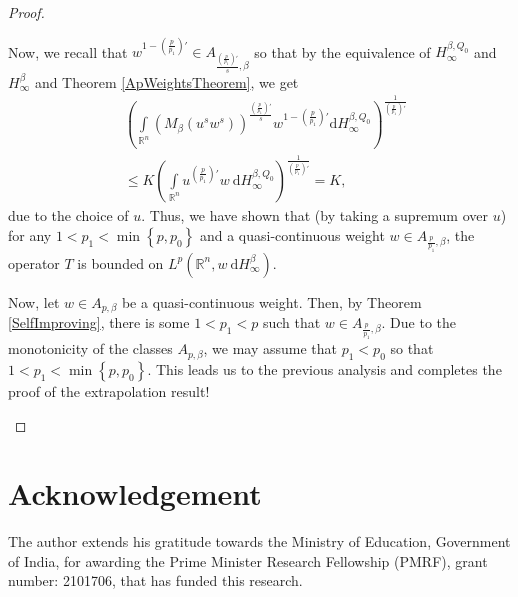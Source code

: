 \documentclass{amsart}
\numberwithin{theorem}{section}
\numberwithin{equation}{section}
\begin{document}
\begin{proof}
\begin{enumerate}
				Now, we recall that $w^{1 - \left( \frac{p}{p_1} \right)'} \in A_{\frac{\left( \frac{p}{p_1} \right)'}{s}, \beta}$ so that by the equivalence of $H^{\beta, Q_0}_{\infty}$ and $H^{\beta}_{\infty}$ and Theorem \ref{ApWeightsTheorem}, we get
				\begin{align*}
					&\left( \int\limits_{\mathbb{R}^n} \left( M_{\beta} \left( u^sw^s \right) \right)^{\frac{\left( \frac{p}{p_1} \right)'}{s}} w^{1 - \left( \frac{p}{p_1} \right)'} \mathrm{d}H^{\beta, Q_0}_{\infty} \right)^{\frac{1}{\left( \frac{p}{p_1} \right)'}} \\
					&\leq K \left( \int\limits_{\mathbb{R}^n} u^{\left( \frac{p}{p_1} \right)'} w \ \mathrm{d}H^{\beta, Q_0}_{\infty} \right)^{\frac{1}{\left( \frac{p}{p_1} \right)'}} = K,
				\end{align*}
				due to the choice of $u$. Thus, we have shown that (by taking a supremum over $u$) for any $1 < p_1 < \min \left\lbrace p, p_0 \right\rbrace$ and a quasi-continuous weight $w \in A_{\frac{p}{p_1}, \beta}$, the operator $T$ is bounded on $L^p \left( \mathbb{R}^n, w \ \mathrm{d}H^{\beta}_{\infty} \right)$.
				
				Now, let $w \in A_{p, \beta}$ be a quasi-continuous weight. Then, by Theorem \ref{SelfImproving}, there is some $1 < p_1 < p$ such that $w \in A_{\frac{p}{p_1}, \beta}$. Due to the monotonicity of the classes $A_{p, \beta}$, we may assume that $p_1 < p_0$ so that $1 < p_1 < \min \left\lbrace p, p_0 \right\rbrace$. This leads us to the previous analysis and completes the proof of the extrapolation result!
			\end{enumerate}
		\end{proof}
	\section*{Acknowledgement}
		The author extends his gratitude towards the Ministry of Education, Government of India, for awarding the Prime Minister Research Fellowship (PMRF), grant number: 2101706, that has funded this research.
\end{document}

